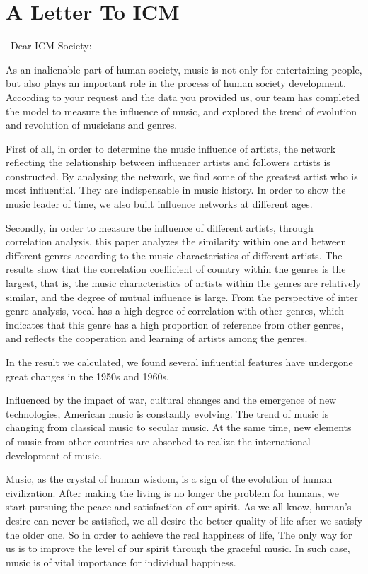 \documentclass[12pt]{article}
\begin{document}
\section{A Letter To ICM}\quad\
Dear ICM Society:\par
As an inalienable part of human society, music is not only for entertaining people, but also plays an important role in the process of human society development. According to your request and the data you provided us, our team has completed the model to measure the influence of music, and explored the trend of evolution and revolution of musicians and genres. \par
First of all, in order to determine the music influence of artists, the network reflecting the relationship between influencer artists and followers artists is constructed. By analysing the network, we find some of the greatest artist who is most influential. They are indispensable in music history. In order to show the music leader of time, we also built influence networks at different ages.\par
Secondly, in order to measure the influence of different artists, through correlation analysis, this paper analyzes the similarity within one and between different genres according to the music characteristics of different artists. The results show that the correlation coefficient of country within the genres is the largest, that is, the music characteristics of artists within the genres are relatively similar, and the degree of mutual influence is large. From the perspective of inter genre analysis, vocal has a high degree of correlation with other genres, which indicates that this genre has a high proportion of reference from other genres, and reflects the cooperation and learning of artists among the genres.\par
In the result we calculated, we found several influential features have undergone great changes in the 1950s and 1960s. \par
Influenced by the impact of war, cultural changes and the emergence of new technologies, American music is constantly evolving. The trend of music is changing from classical music to secular music. At the same time, new elements of music from other countries are absorbed to realize the international development of music.\par
Music, as the crystal of human wisdom, is a sign of the evolution of human civilization. After making the living is no longer the problem for humans, we start pursuing the peace and satisfaction of our spirit. As we all know, human’s desire can never be satisfied, we all desire the better quality of life after we satisfy the older one. So in order to achieve the real happiness of life, The only way for us is to improve the level of our spirit through the graceful music. In such case, music is of vital importance for individual happiness. \par
\end{document}
